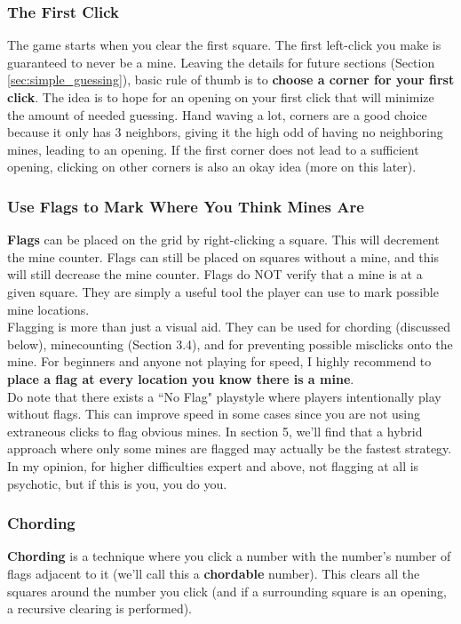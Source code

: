 \subsubsection*{The First Click}
The game starts when you clear the first square. The first left-click you make is guaranteed to never be a mine. Leaving the details for future sections (Section \ref{sec:simple_guessing}), basic rule of thumb is to \textbf{choose a corner for your first click}. The idea is to hope for an opening on your first click that will minimize the amount of needed guessing. Hand waving a lot, corners are a good choice because it only has 3 neighbors, giving it the high odd of having no neighboring mines, leading to an opening. If the first corner does not lead to a sufficient opening, clicking on other corners is also an okay idea (more on this later).\\


\subsubsection*{Use Flags to Mark Where You Think Mines Are}
\textbf{Flags} can be placed on the grid by right-clicking a square. This will decrement the mine counter. Flags can still be placed on squares without a mine, and this will still decrease the mine counter. Flags do NOT verify that a mine is at a given square. They are simply a useful tool the player can use to mark possible mine locations.\\

Flagging is more than just a visual aid. They can be used for chording (discussed below), minecounting (Section 3.4), and for preventing possible misclicks onto the mine. For beginners and anyone not playing for speed, I highly recommend to \textbf{place a flag at every location you know there is a mine}.\\

Do note that there exists a ``No Flag" playstyle where players intentionally play without flags. This can improve speed in some cases since you are not using extraneous clicks to flag obvious mines. In section 5, we'll find that a hybrid approach where only some mines are flagged may actually be the fastest strategy. In my opinion, for higher difficulties expert and above, not flagging at all is psychotic, but if this is you, you do you.\\


\subsubsection*{Chording}
\textbf{Chording} is a technique where you click a number with the number's number of flags adjacent to it (we'll call this a \textbf{chordable} number). This clears all the squares around the number you click (and if a surrounding square is an opening, a recursive clearing is performed).\\

